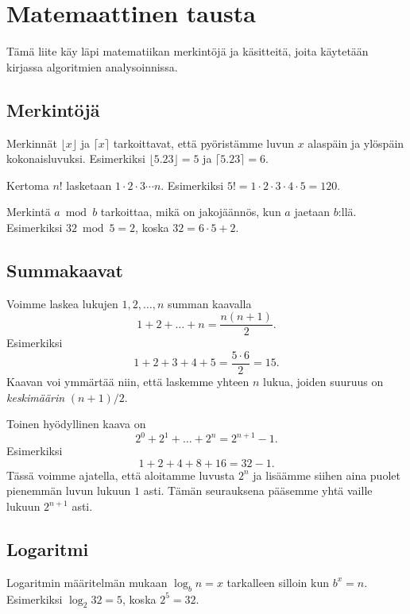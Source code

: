 \chapter{Matemaattinen tausta}

Tämä liite käy läpi matematiikan merkintöjä ja käsitteitä,
joita käytetään kirjassa algoritmien analysoinnissa.

\section*{Merkintöjä}

Merkinnät $\lfloor x \rfloor$ ja $\lceil x \rceil$ tarkoittavat,
että pyöristämme luvun $x$ alaspäin ja ylöspäin kokonaisluvuksi.
Esimerkiksi $\lfloor 5.23 \rfloor = 5$ ja $\lceil 5.23 \rceil = 6$.


Kertoma $n!$ lasketaan $1 \cdot 2 \cdot 3 \cdots n$.
Esimerkiksi $5! = 1 \cdot 2 \cdot 3 \cdot 4 \cdot 5 = 120$.


Merkintä $a \bmod b$ tarkoittaa,
mikä on jakojäännös, kun $a$ jaetaan $b$:llä.
Esimerkiksi $32 \bmod 5 = 2$, koska $32 = 6 \cdot 5 + 2$.

\section*{Summakaavat}


Voimme laskea lukujen $1,2,\dots,n$ summan kaavalla
\[1+2+\dots+n = \frac{n(n+1)}{2}.\]
Esimerkiksi
\[1+2+3+4+5 = \frac{5 \cdot 6}{2}=15.\]
Kaavan voi ymmärtää niin, että laskemme yhteen $n$ lukua,
joiden suuruus on \emph{keskimäärin} $(n+1)/2$.

Toinen hyödyllinen kaava on
\[2^0+2^1+\dots+2^n = 2^{n+1}-1.\]
Esimerkiksi
\[1+2+4+8+16=32-1.\]
Tässä voimme ajatella, että aloitamme luvusta $2^n$
ja lisäämme siihen aina puolet pienemmän luvun lukuun $1$ asti.
Tämän seurauksena pääsemme yhtä vaille lukuun $2^{n+1}$ asti.

\section*{Logaritmi}


Logaritmin määritelmän mukaan $\log_b n =x$
tarkalleen silloin kun $b^x=n$.
Esimerkiksi $\log_2 32=5$, koska $2^5=32$.

